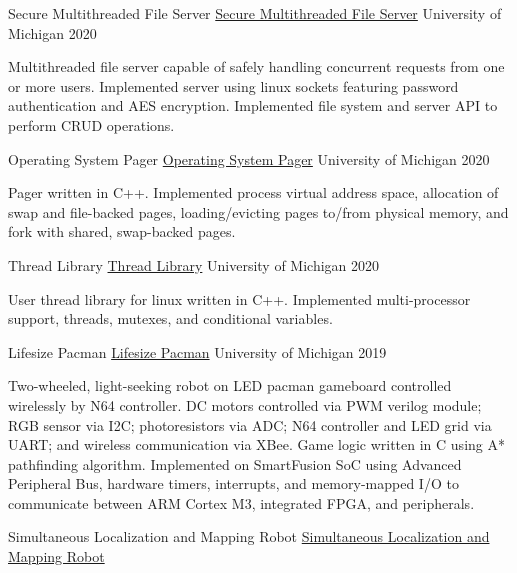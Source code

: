\documentclass[11pt, a4paper]{cv}
\begin{document}
\begin{cv}
\begin{projects}
\begin{cventries}
{\begin{cvparagraph}
\end{cvparagraph}}
\cventrycompact
{\ifstrempty{}
{Secure Multithreaded File Server}
{\color{hrefblue}\href{}{Secure Multithreaded File Server}}}
{}
{University of Michigan}
{2020}
{\begin{cvparagraph}
Multithreaded file server capable of safely handling concurrent requests from one or more users. Implemented server using linux sockets featuring password authentication and AES encryption. Implemented file system and server API to perform CRUD operations.
\end{cvparagraph}}
\cventrycompact
{\ifstrempty{}
{Operating System Pager}
{\color{hrefblue}\href{}{Operating System Pager}}}
{}
{University of Michigan}
{2020}
{\begin{cvparagraph}
Pager written in C++. Implemented process virtual address space, allocation of swap and file-backed pages, loading/evicting pages to/from physical memory, and fork with shared, swap-backed pages.
\end{cvparagraph}}
\cventrycompact
{\ifstrempty{}
{Thread Library}
{\color{hrefblue}\href{}{Thread Library}}}
{}
{University of Michigan}
{2020}
{\begin{cvparagraph}
User thread library for linux written in C++. Implemented multi-processor support, threads, mutexes, and conditional variables.
\end{cvparagraph}}
\cventrycompact
{
{Lifesize Pacman}
{\color{hrefblue}\href{https://drive.google.com/drive/folders/17rF1uKOLnCBRHLGBaE6ZqqsGw5RSQBDj}{Lifesize Pacman}}}
{}
{University of Michigan}
{2019}
{\begin{cvparagraph}
Two-wheeled, light-seeking robot on LED pacman gameboard controlled wirelessly by N64 controller. DC motors controlled via PWM verilog module; RGB sensor via I2C; photoresistors via ADC; N64 controller and LED grid via UART; and wireless communication via XBee. Game logic written in C using A* pathfinding algorithm. Implemented on SmartFusion SoC using Advanced Peripheral Bus, hardware timers, interrupts, and memory-mapped I/O to communicate between ARM Cortex M3, integrated FPGA, and peripherals.
\end{cvparagraph}}
\cventrycompact
{
{Simultaneous Localization and Mapping Robot}
{\color{hrefblue}\href{https://drive.google.com/drive/folders/17grbDyJVI5lJKkwWEvUcQP1EiyA9-lvp}{Simultaneous Localization and Mapping Robot}}}

\end{cventries}
\end{projects}
\end{cv}
\end{document}
